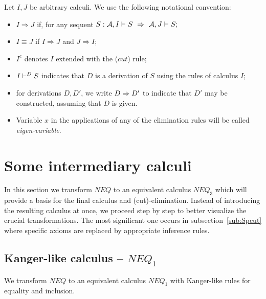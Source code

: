 %
\begin{DEFINITION} Let $I, J$ be arbitrary
calculi. We use the following notational convention:
\begin{itemize}\MyLPar
\item $I \Rightarrow J$ if, for any sequent $S : {{\cal {A}}, I}\vdash^{{}}S 
\ \Rightarrow\  {{\cal {A}}, J}\vdash^{{}}S;$
\item $I\equiv J$ if $I\Rightarrow J$ and $J\Rightarrow I$;
\item $I^c$ denotes $I$ extended with the 
($cut$) rule;
\item ${I}\vdash^{{D}}S$ indicates that $D$ is a derivation of $S$ 
using the rules of calculus $I$;
\item for derivations $D, D'$, we write $D\mathrel\Rightarrow D'$ to indicate that $D'$
may be constructed, assuming that $D$ is given.
\item Variable $x$ in the applications of any of the elimination rules will be called
{\em eigen-variable}.
\end{itemize}
\end{DEFINITION}
%
%
\section{Some intermediary calculi}\label{se:inter}
In this section we transform $NEQ$ to an equivalent calculus 
$NEQ_{3}$ which will provide a basis for the final calculus and 
(cut)-elimination.
Instead of introducing the resulting calculus at once, we proceed 
step by step to better visualize the crucial transformations. The most 
significant one occurs in subsection~\ref{sub:Spcut} where specific 
axioms are replaced by appropriate inference rules.

\subsection{Kanger-like calculus -- $NEQ_1$}\label{se:neq1}
We transform $NEQ$ to an equivalent calculus $NEQ_1$ 
with Kanger-like rules for equality \cite{K} and inclusion.

